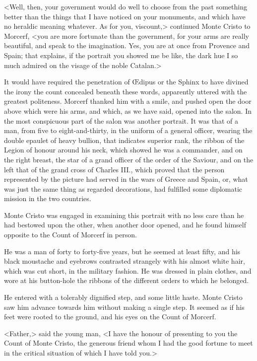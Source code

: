  <Well, then, your government would do well to choose from the past something better than the things that I have noticed on your monuments, and which have no heraldic meaning whatever. As for you, viscount,> continued Monte Cristo to Morcerf, <you are more fortunate than the government, for your arms are really beautiful, and speak to the imagination. Yes, you are at once from Provence and Spain; that explains, if the portrait you showed me be like, the dark hue I so much admired on the visage of the noble Catalan.> 

 It would have required the penetration of Œdipus or the Sphinx to have divined the irony the count concealed beneath these words, apparently uttered with the greatest politeness. Morcerf thanked him with a smile, and pushed open the door above which were his arms, and which, as we have said, opened into the salon. In the most conspicuous part of the salon was another portrait. It was that of a man, from five to eight-and-thirty, in the uniform of a general officer, wearing the double epaulet of heavy bullion, that indicates superior rank, the ribbon of the Legion of honour around his neck, which showed he was a commander, and on the right breast, the star of a grand officer of the order of the Saviour, and on the left that of the grand cross of Charles III., which proved that the person represented by the picture had served in the wars of Greece and Spain, or, what was just the same thing as regarded decorations, had fulfilled some diplomatic mission in the two countries. 

 Monte Cristo was engaged in examining this portrait with no less care than he had bestowed upon the other, when another door opened, and he found himself opposite to the Count of Morcerf in person. 

 He was a man of forty to forty-five years, but he seemed at least fifty, and his black moustache and eyebrows contrasted strangely with his almost white hair, which was cut short, in the military fashion. He was dressed in plain clothes, and wore at his button-hole the ribbons of the different orders to which he belonged. 

 He entered with a tolerably dignified step, and some little haste. Monte Cristo saw him advance towards him without making a single step. It seemed as if his feet were rooted to the ground, and his eyes on the Count of Morcerf. 

 <Father,> said the young man, <I have the honour of presenting to you the Count of Monte Cristo, the generous friend whom I had the good fortune to meet in the critical situation of which I have told you.> 

